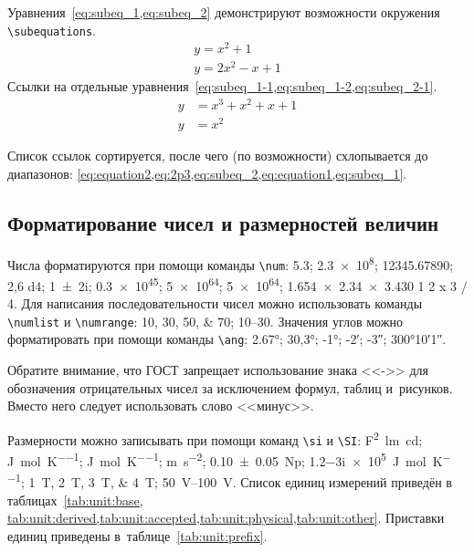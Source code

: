 Уравнения~\cref{eq:subeq_1,eq:subeq_2} демонстрируют возможности
окружения \verb|\subequations|.
\begin{subequations}
    \label{eq:subeq_1}
    \begin{gather}
        y = x^2 + 1 \label{eq:subeq_1-1} \\
        y = 2 x^2 - x + 1 \label{eq:subeq_1-2}
    \end{gather}
\end{subequations}
Ссылки на отдельные уравнения~\cref{eq:subeq_1-1,eq:subeq_1-2,eq:subeq_2-1}.
\begin{subequations}
    \label{eq:subeq_2}
    \begin{align}
        y & = x^3 + x^2 + x + 1 \label{eq:subeq_2-1} \\
        y & = x^2
    \end{align}
\end{subequations}

Список ссылок сортируется, после чего (по возможности) схлопывается до диапазонов: \cref{eq:equation2,eq:2p3,eq:subeq_2,eq:equation1,eq:subeq_1}.

\subsection{Форматирование чисел и размерностей величин}\label{sec:units}

Числа форматируются при помощи команды \verb|\num|:
\num{5,3};
\num{2,3e8};
\num{12345,67890};
\num{2,6 d4};
\num{1+-2i};
\num{.3e45};
\num[exponent-base=2]{5 e64};
\num[exponent-base=2,exponent-to-prefix]{5 e64};
\num{1.654 x 2.34 x 3.430}
\num{1 2 x 3 / 4}.
Для написания последовательности чисел можно использовать команды \verb|\numlist| и \verb|\numrange|:
\numlist{10;30;50;70}; \numrange{10}{30}.
Значения углов можно форматировать при помощи команды \verb|\ang|:
\ang{2.67};
\ang{30,3};
\ang{-1;;};
\ang{;-2;};
\ang{;;-3};
\ang{300;10;1}.

Обратите внимание, что ГОСТ запрещает использование знака <<->> для обозначения отрицательных чисел
за исключением формул, таблиц и~рисунков.
Вместо него следует использовать слово <<минус>>.

Размерности можно записывать при помощи команд \verb|\si| и \verb|\SI|:
\si{\farad\squared\lumen\candela};
\si{\joule\per\mole\per\kelvin};
\si[per-mode = symbol-or-fraction]{\joule\per\mole\per\kelvin};
\si{\metre\per\second\squared};
\SI{0.10(5)}{\neper};
\SI{1.2-3i e5}{\joule\per\mole\per\kelvin};
\SIlist{1;2;3;4}{\tesla};
\SIrange{50}{100}{\volt}.
Список единиц измерений приведён в таблицах~\cref{tab:unit:base,
    tab:unit:derived,tab:unit:accepted,tab:unit:physical,tab:unit:other}.
Приставки единиц приведены в~таблице~\cref{tab:unit:prefix}.

